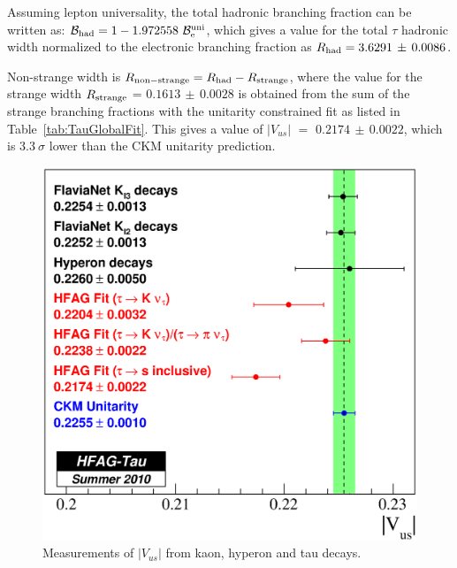 \documentclass[fleqn,twoside]{article}
\def\Vus  {\ensuremath{|V_{us}|}\xspace}
\def\mtau       {\ensuremath{\tau}\xspace}
\begin{document}
Assuming lepton universality, the total hadronic branching fraction 
can be written as: ${\cal{B}}_{\rm{had}} = 1 - 1.972558 ~ {\cal{B}}^{\rm{uni}}_{\rm{e}}$,
which gives a value for the total \mtau hadronic width normalized to 
the electronic branching fraction as $R_{\rm{had}} = 3.6291\, \pm\, 0.0086$.

Non-strange width is $R_{\rm{non-strange}} = R_{\rm{had}} - R_{\rm{strange}}$,
where the value for the strange width $R_{\rm{strange}}$ = $0.1613\, \pm\, 0.0028$
is obtained from the sum of the strange branching fractions 
with the unitarity constrained fit as listed in Table~\ref{tab:TauGlobalFit}.
This gives a value of  $\Vus$ $=$ $0.2174\, \pm\, 0.0022$,
which is $3.3~\sigma$ lower than the CKM unitarity prediction.




\begin{figure}[!hbtp]
\begin{center}
\includegraphics[height=.38\textheight,width=.49\textwidth]{figures/Vus.eps}
\end{center}
\caption{Measurements of $\Vus$ from kaon, hyperon and tau decays.}
\label{fig:Vus}
\end{figure}
 
\end{document}
